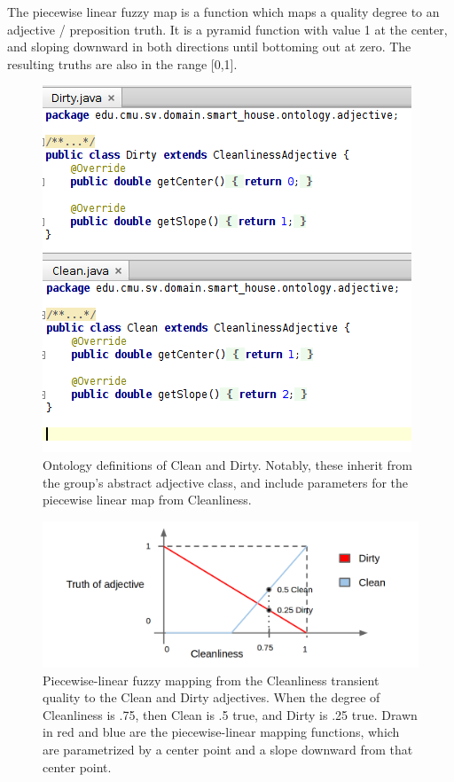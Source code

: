 \documentclass[titlepage]{article}
\begin{document}
The piecewise linear fuzzy map is a function which maps a quality degree to an adjective / preposition truth.
It is a pyramid function with value 1 at the center, and sloping downward in both directions until bottoming out at zero.
The resulting truths are also in the range [0,1].

\begin{figure}[h!]
\centering
\includegraphics[width=.6\textwidth]{CleanAndDirty}
\caption{Ontology definitions of Clean and Dirty.
Notably, these inherit from the group's abstract adjective class, and include parameters for the piecewise linear map from Cleanliness.}
\label{fig:clean_and_dirty_definition}
\end{figure}


\begin{figure}[h!]
\centering
\includegraphics[width=\textwidth]{CleanDirtyFuzzyMap}
\caption{Piecewise-linear fuzzy mapping from the Cleanliness transient quality to the Clean and Dirty adjectives. 
When the degree of Cleanliness is .75, then Clean is .5 true, and Dirty is .25 true.
Drawn in red and blue are the piecewise-linear mapping functions, which are parametrized by a center point and a slope downward from that center point.}
\label{fig:clean_dirty_fuzzy_map}
\end{figure}
\end{document}
